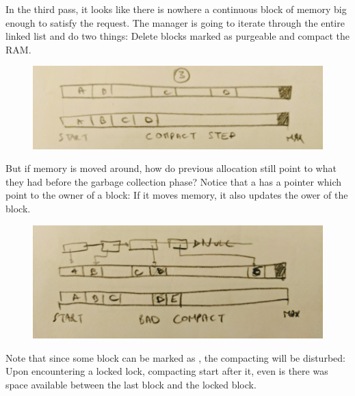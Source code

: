 \documentclass[book.tex]{subfiles}
\begin{document}
 \par
 In the third pass, it looks like there is nowhere a continuous block of memory big enough to satisfy the request. The manager is going to iterate through the entire linked list and do two things: Delete blocks marked as purgeable and compact the RAM.
  \par
\begin{figure}[H]
\centering
 \includegraphics[width=\textwidth]{imgs/mm_compact.png}
 \end{figure}
 \par
But if memory is moved around, how do previous allocation still point to what they had before the garbage collection phase? Notice that a  has a  pointer which point to the owner of a block: If it moves memory, it also updates the ower of the block.

   \par
\begin{figure}[H]
\centering
 \includegraphics[width=\textwidth]{imgs/mm_compact_bad_case.png}
 \end{figure}
 \par
 Note that since some block can be marked as , the compacting will be disturbed: Upon encountering a locked lock, compacting start after it, even is there was space available between the last block and the locked block.
\end{document}
